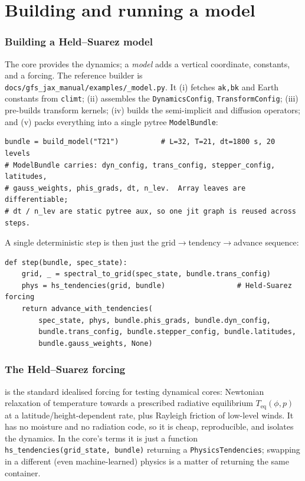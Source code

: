 \documentclass[11pt]{article}
\newcommand{\code}[1]{\texttt{#1}}
\begin{document}
\part{Building and running a model}

\section{Building a Held--Suarez model}\label{sec:build}

The core provides the dynamics; a \emph{model} adds a vertical coordinate,
constants, and a forcing. The reference builder is
\code{docs/gfs\_jax\_manual/examples/\_model.py}. It (i) fetches \code{ak,bk} and
Earth constants from \code{climt}; (ii) assembles the \code{DynamicsConfig},
\code{TransformConfig}; (iii) pre-builds transform kernels; (iv) builds the
semi-implicit and diffusion operators; and (v) packs everything into a single
pytree \code{ModelBundle}:

\begin{lstlisting}
bundle = build_model("T21")          # L=32, T=21, dt=1800 s, 20 levels
# ModelBundle carries: dyn_config, trans_config, stepper_config, latitudes,
# gauss_weights, phis_grads, dt, n_lev.  Array leaves are differentiable;
# dt / n_lev are static pytree aux, so one jit graph is reused across steps.
\end{lstlisting}

A single deterministic step is then just the grid$\to$tendency$\to$advance
sequence:
\begin{lstlisting}
def step(bundle, spec_state):
    grid, _ = spectral_to_grid(spec_state, bundle.trans_config)
    phys = hs_tendencies(grid, bundle)                 # Held-Suarez forcing
    return advance_with_tendencies(
        spec_state, phys, bundle.phis_grads, bundle.dyn_config,
        bundle.trans_config, bundle.stepper_config, bundle.latitudes,
        bundle.gauss_weights, None)
\end{lstlisting}

\section{The Held--Suarez forcing}

\citet{heldsuarez1994} is the standard idealised forcing for testing dynamical
cores: Newtonian relaxation of temperature towards a prescribed radiative
equilibrium $T_{\text{eq}}(\phi,p)$ at a latitude/height-dependent rate, plus
Rayleigh friction of low-level winds. It has no moisture and no radiation code, so
it is cheap, reproducible, and isolates the dynamics. In the core's terms it is
just a function \code{hs\_tendencies(grid\_state, bundle)} returning a
\code{PhysicsTendencies}; swapping in a different (even machine-learned) physics is
a matter of returning the same container.
\end{document}
